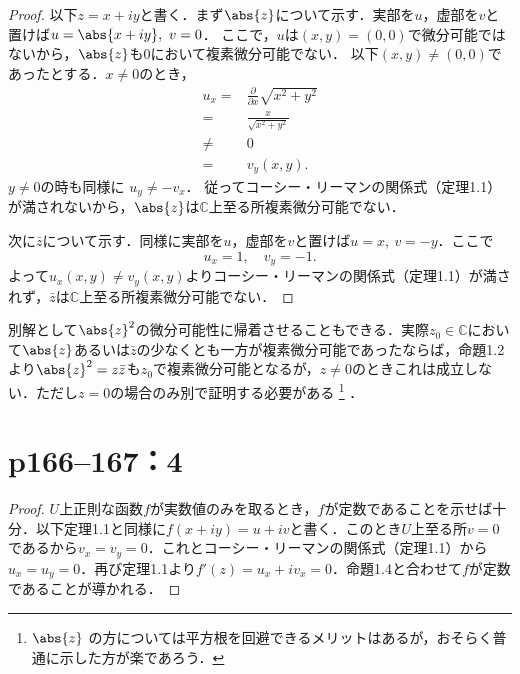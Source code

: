 \begin{tleftbar}
    \begin{proof}
        以下$z = x + iy$と書く．まず$\abs{z}$について示す．実部を$u$，虚部を$v$と置けば$u = \abs{x + iy},\ v = 0$．
        ここで，$u$は$(x, y) = (0, 0)$で微分可能ではないから，$\abs{z}$も$0$において複素微分可能でない．
        以下$(x, y) \neq (0, 0)$であったとする．$x \neq 0$のとき，
        \begin{align*}
            u_x ={} & \frac{\partial}{\partial x}\sqrt{x^2 + y^2} \\
            ={}     & \frac{x}{\sqrt{x^2 + y^2}}                  \\
            \neq{}  & 0                                           \\
            ={}     & v_y(x, y).
        \end{align*}
        $y \neq 0$の時も同様に $u_y \neq -v_x$．
        従ってコーシー・リーマンの関係式（定理1.1）が満されないから，$\abs{z}$は$\mathbb{C}$上至る所複素微分可能でない．

        次に$\bar{z}$について示す．同様に実部を$u$，虚部を$v$と置けば$u = x,\ v = -y$．ここで
        \[
            u_x = 1,\quad v_y = -1.
        \]
        よって$u_x(x, y) \neq v_y(x, y)$よりコーシー・リーマンの関係式（定理1.1）が満されず，$\bar{z}$は$\mathbb{C}$上至る所複素微分可能でない．
    \end{proof}
\end{tleftbar}

別解として$\abs{z}^2$の微分可能性に帰着させることもできる．実際$z_0 \in \mathbb{C}$において$\abs{z}$あるいは$\bar{z}$の少なくとも一方が複素微分可能であったならば，命題1.2より$\abs{z}^2 = z\bar{z}$も$z_0$で複素微分可能となるが，$z \neq 0$のときこれは成立しない．ただし$z = 0$の場合のみ別で証明する必要がある%
\footnote{$\abs{z}$ の方については平方根を回避できるメリットはあるが，おそらく普通に示した方が楽であろう．}%
．


\section*{p166--167：4}

\begin{tleftbar}
    \begin{proof}
        $U$上正則な函数$f$が実数値のみを取るとき，$f$が定数であることを示せば十分．以下定理1.1と同様に$f(x + iy) = u + iv$と書く．このとき$U$上至る所$v = 0$であるから$v_x = v_y = 0$．これとコーシー・リーマンの関係式（定理1.1）から$u_x = u_y = 0$．再び定理1.1より$f'(z) = u_x + iv_x = 0$．命題1.4と合わせて$f$が定数であることが導かれる．
    \end{proof}
\end{tleftbar}

